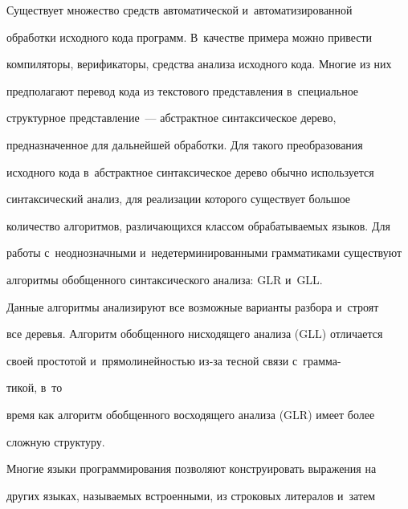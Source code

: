 \vspace*{-4pt}





Существует множество средств автоматической и~автоматизированной


обработки исходного кода программ. В~качестве примера можно привести


компиляторы, верификаторы, средства анализа исходного кода. Многие из них


предполагают перевод кода из текстового представления в~специальное


структурное представление~--- абстрактное синтаксическое дерево,


предназначенное для дальнейшей обработки. Для такого преобразования


исходного кода в~абстрактное синтаксическое дерево обычно используется


синтаксический анализ, для реализации которого существует большое


количество алгоритмов, различающихся классом обрабатываемых языков. Для


работы с~неоднозначными и~недетерминированными грамматиками существуют


алгоритмы обобщенного синтаксического анализа: GLR и~GLL.


Данные алгоритмы анализируют все возможные варианты разбора и~строят


все деревья. Алгоритм обобщенного нисходящего анализа (GLL) отличается


своей простотой и~прямолинейностью из-за тесной связи с~грамма-\linebreak\vspace*{-12pt}





\pagebreak





\noindent


тикой, в~то


время как алгоритм обобщенного восходящего анализа (GLR) имеет более


сложную структуру.





Многие языки программирования позволяют конструировать выражения на


других языках, называемых встроенными, из строковых литералов и~затем


